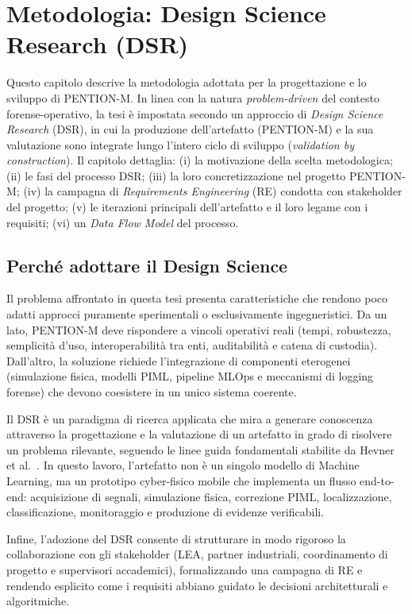 
\chapter{Metodologia: Design Science Research (DSR)}
\label{chap:dsr}

Questo capitolo descrive la metodologia adottata per la progettazione e lo sviluppo di PENTION-M.
In linea con la natura \emph{problem-driven} del contesto forense-operativo, la tesi è impostata secondo un approccio di \emph{Design Science Research} (DSR), in cui la produzione dell'artefatto (PENTION-M) e la sua valutazione sono integrate lungo l'intero ciclo di sviluppo (\emph{validation by construction}).
Il capitolo dettaglia: (i) la motivazione della scelta metodologica; (ii) le fasi del processo DSR; (iii) la loro concretizzazione nel progetto PENTION-M; (iv) la campagna di \emph{Requirements Engineering} (RE) condotta con stakeholder del progetto; (v) le iterazioni principali dell'artefatto e il loro legame con i requisiti; (vi) un \emph{Data Flow Model} del processo.

\section{Perché adottare il Design Science}
\label{sec:dsr_why}

Il problema affrontato in questa tesi presenta caratteristiche che rendono poco adatti approcci puramente sperimentali o esclusivamente ingegneristici.
Da un lato, PENTION-M deve rispondere a vincoli operativi reali (tempi, robustezza, semplicità d'uso, interoperabilità tra enti, auditabilità e catena di custodia).
Dall'altro, la soluzione richiede l'integrazione di componenti eterogenei (simulazione fisica, modelli PIML, pipeline MLOps e meccanismi di logging forense) che devono coesistere in un unico sistema coerente.

Il DSR è un paradigma di ricerca applicata che mira a generare conoscenza attraverso la progettazione e la valutazione di un artefatto in grado di risolvere un problema rilevante, seguendo le linee guida fondamentali stabilite da Hevner et al.~\cite{hevner2004dsr}.
In questo lavoro, l'artefatto non è un singolo modello di Machine Learning, ma un prototipo cyber-fisico mobile che implementa un flusso end-to-end: acquisizione di segnali, simulazione fisica, correzione PIML, localizzazione, classificazione, monitoraggio e produzione di evidenze verificabili.

Infine, l'adozione del DSR consente di strutturare in modo rigoroso la collaborazione con gli stakeholder (LEA, partner industriali, coordinamento di progetto e supervisori accademici), formalizzando una campagna di RE e rendendo esplicito come i requisiti abbiano guidato le decisioni architetturali e algoritmiche.

